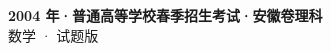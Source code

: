 \documentclass[zihao=-4, a4paper]{ctexart}
\begin{document}
\begin{center}
  {\Large\bfseries 2004 年·普通高等学校春季招生考试·安徽卷理科}\\[4pt]
  {\large 数学 · 试题版}
\end{center}
\medskip
{}

\end{document}
